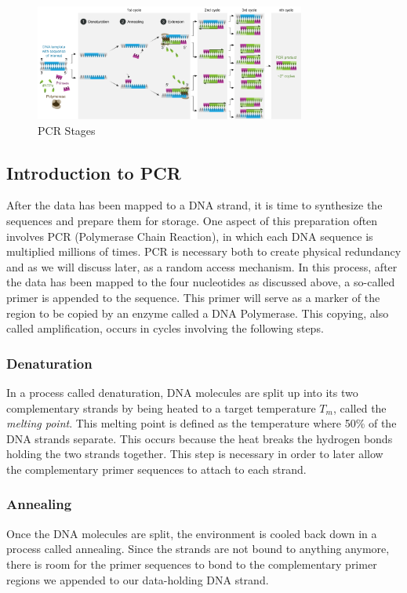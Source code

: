 \documentclass[a4paper,conference]{IEEEtran}
\begin{document}
\begin{figure}[!t]
\centering
\includegraphics[width=3.5in]{pcr}
\caption{PCR Stages}
\label{fig_sim}
\end{figure}

\subsection{Introduction to PCR}

After the data has been mapped to a DNA strand, it is time to synthesize the sequences and prepare them for storage. One aspect of this preparation often involves PCR (Polymerase Chain Reaction), in which each DNA sequence is multiplied millions of times. PCR is necessary both to create physical redundancy and as we will discuss later, as a random access mechanism. In this process, after the data has been mapped to the four nucleotides as discussed above, a so-called primer is appended to the sequence. This primer will serve as a marker of the region to be copied by an enzyme called a DNA Polymerase. This copying, also called amplification, occurs in cycles involving the following steps. \\

\subsubsection{Denaturation}
In a process called denaturation, DNA molecules are split up into its two complementary strands by being heated to a target temperature $T_m$, called the \textit{melting point}. This melting point is defined as the temperature where 50\% of the DNA strands separate. This occurs because the heat breaks the hydrogen bonds holding the two strands together. This step is necessary in order to later allow the complementary primer sequences to attach to each strand. \\
\subsubsection{Annealing}
Once the DNA molecules are split, the environment is cooled back down in a process called annealing. Since the strands are not bound to anything anymore, there is room for the primer sequences to bond to the complementary primer regions we appended to our data-holding DNA strand.\\
\end{document}
